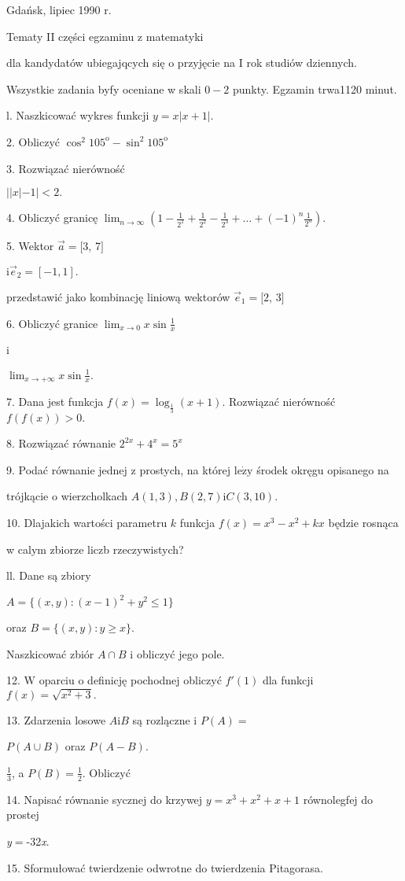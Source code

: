 \documentclass[a4paper,12pt]{article}
\begin{document}
Gdańsk, lipiec 1990 r.

Tematy II części egzaminu z matematyki

dla kandydatów ubiegajqcych się o przyjęcie na I rok studiów dziennych.

Wszystkie zadania byfy oceniane w skali $0-2$ punkty. Egzamin trwa1120 minut.

l. Naszkicować wykres funkcji $y=x|x+1|.$

2. Obliczyć $\cos^{2}105^{\mathrm{o}}-\sin^{2}105^{\mathrm{o}}$

3. Rozwiązać nierówność

$||x|-1|<2.$

4. Obliczyć granicę $\displaystyle \lim_{n\rightarrow\infty}(1-\frac{1}{2^{1}}+\frac{1}{2^{2}}-\frac{1}{2^{3}}+\ldots+(-1)^{n}\frac{1}{2^{n}}).$

5. Wektor $\vec{a}=[3$, 7$]$

$\mathrm{i}\vec{e}_{2}=[-1,1].$

przedstawić jako kombinację liniową wektorów $\vec{e}_{1}=[2$, 3$]$

6. Obliczyć granice $\displaystyle \lim_{x\rightarrow 0}x\sin\frac{1}{x}$

i

$\displaystyle \lim_{x\rightarrow+\infty}x\sin\frac{1}{x}.$

7. Dana jest funkcja $f(x)=\log_{\frac{1}{3}}(x+1)$. Rozwiązać nierówność $f(f(x))>0.$

8. Rozwiązać równanie $2^{2x}+4^{x}=5^{x}$

9. Podać równanie jednej z prostych, na której $\mathrm{l}\mathrm{e}\dot{\mathrm{z}}\mathrm{y}$ środek okręgu opisanego na

trójkącie o wierzcholkach $A(1,3), B(2,7)\mathrm{i}C(3,10).$

10. Dlajakich wartości parametru $k$ funkcja $f(x)=x^{3}-x^{2}+kx$ będzie rosnąca

w calym zbiorze liczb rzeczywistych?

ll. Dane są zbiory

$A=\{(x,y):(x-1)^{2}+y^{2}\leq 1\}$

oraz $B=\{(x,y):y\geq x\}.$

Naszkicować zbiór $A\cap B$ i obliczyć jego pole.

12. $\mathrm{W}$ oparciu o definicję pochodnej obliczyć $f'(1)$ dla funkcji $f(x)=\sqrt{x^{2}+3}.$

13. Zdarzenia losowe $A \mathrm{i} B$ są rozlączne i $P(A) =$

$P(A\cup B)$ oraz $P(A-B).$

$\displaystyle \frac{1}{3}$, a $P(B) = \displaystyle \frac{1}{2}$. Obliczyć

14. Napisać równanie sycznej do krzywej $y=x^{3}+x^{2}+x+1$ równolegfej do prostej

{\it y}$=$-32{\it x}.

15. Sformułować twierdzenie odwrotne do twierdzenia Pitagorasa.
\end{document}
